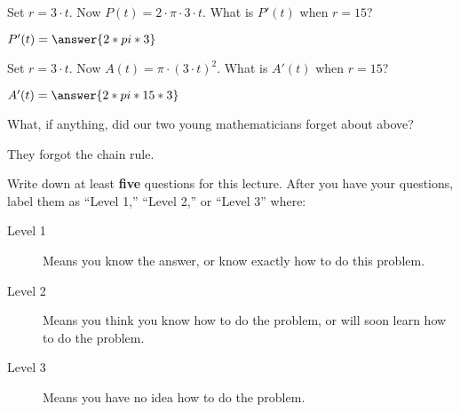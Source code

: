 \documentclass{ximera}
\begin{document}
\begin{problem}
  Set $r=3\cdot t$. Now $P(t) = 2\cdot \pi\cdot 3\cdot t$. What is
  $P'(t)$ when $r=15$?
  \begin{prompt}
    $P'(t)=\answer{2*pi*3}$
  \end{prompt}
\end{problem}

\begin{problem}
  Set $r=3\cdot t$. Now $A(t) = \pi\cdot (3\cdot t)^2$. What is
  $A'(t)$ when $r=15$?
  \begin{prompt}
    $A'(t)=\answer{2*pi*15*3}$
  \end{prompt}
\end{problem}

\begin{problem}
  What, if anything, did our two young mathematicians forget about above?
  \begin{freeResponse}
 They forgot the chain rule.
  \end{freeResponse}
\end{problem}



\begin{xarmaBoost}
  Write down at least \textbf{five} questions for this lecture. After
  you have your questions, label them as ``Level 1,'' ``Level 2,'' or
  ``Level 3'' where:
\begin{description}
\item[Level 1] Means you know the answer, or know exactly how to do
  this problem.
\item[Level 2] Means you think you know how to do the problem, or will
  soon learn how to do the problem.
\item[Level 3] Means you have no idea how to do the problem.
\end{description}
\begin{freeResponse}
\end{freeResponse}
\end{xarmaBoost}
\end{document}
